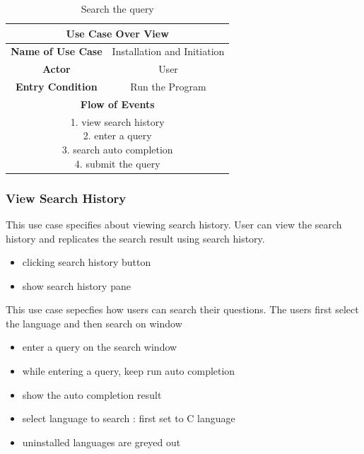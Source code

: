 \documentclass[conference]{IEEEtran}
\begin{document}
\begin{table}[hbt]
\renewcommand{\arraystretch}{1}
\caption{Search the query}
\label{table:usecase2}
\centering
\begin{adjustbox}{width=0.3\textwidth}
\small
\begin{tabular}{c|c}
\hline
\multicolumn{2}{c}{\textbf{Use Case Over View}} \\
\hline
\textbf{Name of Use Case} & Installation and Initiation \\
\hline
\textbf{Actor} & User \\
\hline
\textbf{Entry Condition} & Run the Program\\
\hline
\multicolumn{2}{c}{\textbf{Flow of Events}}\\
\hline
\multicolumn{2}{c}{
\parbox[t]{5cm}{
  1. view search history \\
  2. enter a query \\
  3. search auto completion \\
  4. submit the query
  }
}\\
\hline

\end{tabular}
\end{adjustbox}
\end{table}


\subsubsection{View Search History}
This use case specifies about viewing search history. User can view the search history and replicates the search result using search history.
\begin{itemize}
  \item clicking search history button
  \item show search history pane
\end{itemize}
\textit{}
This use case sepecfies how users can search their questions. The users first select the language and then search on window
\begin{itemize}
  \item enter a query on the search window
  \item while entering a query, keep run auto completion
  \item show the auto completion result
  \item select language to search : first set to C language
  \item uninstalled languages are greyed out
\end{itemize}
\textit{}
\end{document}
